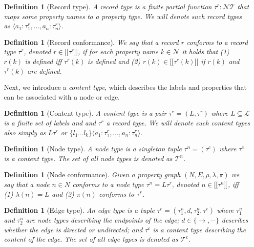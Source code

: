 \documentclass[a4paper]{article}
\makeatletter
\newtheorem{definition}[theorem]{Definition}
\newcommand{\ptypes}{\mathcal{T}}
\newcommand{\rtype}{\tau^r}
\newcommand{\ctype}{\tau^c}
\newcommand{\ntype}{\tau^n}
\newcommand{\ntypes}{\mathcal{T}^n}
\newcommand{\etype}{\tau^e}
\newcommand{\etypes}{\mathcal{T}^e}
\newcommand{\lsem}{\ensuremath{[\![}}
\newcommand{\rsem}{\ensuremath{]\!]}}
\newcommand{\sem}[1]{\ensuremath{\lsem #1 \rsem}}
\newcommand{\pto}{}%
\DeclareRobustCommand{\pto}{\mathrel{\mathpalette\p@to@gets\to}}
\newcommand{\p@to@gets}[2]{%
  \ooalign{\hidewidth$\m@th#1\mapstochar\mkern5mu$\hidewidth\cr$\m@th#1\to$\cr}%
}
\makeatother
\begin{document}
\begin{definition}[Record type]
  A \emph{record type} is a finite partial function $\rtype : \mathcal{N} \pto \ptypes$ that maps some property names to a property type. We will denote such record types as $\langle a_1 : \rtype_1, \ldots, a_n : \rtype_n \rangle$.
\end{definition}

\begin{definition}[Record conformance]
  We say that a record $r$ \emph{conforms} to a record type $\rtype$, denoted $r \in \sem{\rtype}$, if for each property name $k \in \mathcal{N}$ it holds that (1) $r(k)$ is defined iff $\rtype(k)$ is defined and (2) $r(k) \in \sem{\rtype(k)}$ if $r(k)$ and $\rtype(k)$ are defined.
\end{definition}

Next, we introduce a \emph{content type}, which describes the labels and properties that can be associated with a node or edge.

\begin{definition}[Content type]
  A \emph{content type} is a pair $\ctype = (L, \rtype)$ where $L \subseteq \mathcal{L}$ is a finite set of labels and and $\rtype$ a record type. We will denote such content types also simply as $L \rtype$ or $\{ l_1 \ldots l_k \} \langle a_1 : \rtype_1, \ldots, a_n : \rtype_n \rangle$.
\end{definition}

\begin{definition}[Node type]
  A \emph{node type} is a singleton tuple $\ntype = (\ctype)$ where $\ctype$ is a content type. The set of all node types is denoted as $\ntypes$.
\end{definition}

\begin{definition}[Node conformance]
  Given a property graph $(N, E, \rho, \lambda, \pi)$ we say that a node $n \in N$ \emph{conforms} to a node type $\ntype = L\rtype$, denoted $n \in \sem{\ntype}$, iff (1) $\lambda(n) = L$ and (2) $\pi(n)$ conforms to $\rtype$.
\end{definition}

\begin{definition}[Edge type]
  An \emph{edge type} is a tuple $\etype = (\ntype_1, d, \ntype_2, \ctype)$ where $\ntype_1$ and $\ntype_2$ are node types describing the endpoints of the edge; $d \in \{\rightarrow, -\}$ describes whether the edge is directed or undirected; and $\ctype$ is a content type describing the content of the edge. The set of all edge types is denoted as $\etypes$.
\end{definition}
  
\end{document}

